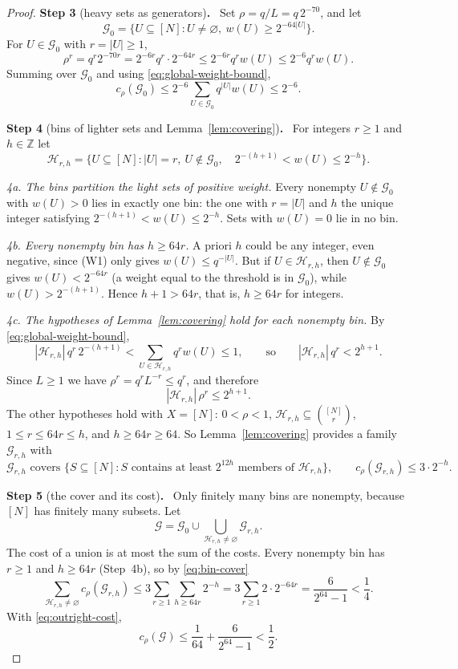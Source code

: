 \documentclass[11pt,letterpaper]{article}
\theoremstyle{definition}
\theoremstyle{remark}
\numberwithin{equation}{section}
\newcommand{\step}[2]{\medskip\noindent\textbf{Step #1} (#2)\textbf{.}\ }
\begin{document}
\begin{proof}
\step{3}{heavy sets as generators}
Set $\rho=q/L=q\,2^{-70}$, and let
\[
 \mathcal G_0=
 \{U\subseteq[N]:U\ne\varnothing,\ w(U)\ge2^{-64|U|}\}.
\]
For $U\in\mathcal G_0$ with $r=|U|\ge1$,
\[
 \rho^r=q^r2^{-70r}=2^{-6r}q^r\cdot2^{-64r}
 \le2^{-6r}q^r w(U)
 \le2^{-6}q^r w(U).
\]
Summing over $\mathcal G_0$ and using \eqref{eq:global-weight-bound},
\begin{equation}\label{eq:outright-cost}
 c_\rho(\mathcal G_0)\le2^{-6}\sum_{U\in\mathcal G_0}q^{|U|}w(U)\le2^{-6}.
\end{equation}

\step{4}{bins of lighter sets and Lemma~\ref{lem:covering}}
For integers $r\ge1$ and $h\in\mathbb Z$ let
\[
 \mathcal H_{r,h}=
 \bigl\{U\subseteq[N]:|U|=r,\ U\notin\mathcal G_0,
 \quad 2^{-(h+1)}<w(U)\le2^{-h}\bigr\}.
\]

\emph{4a. The bins partition the light sets of positive weight.} Every
nonempty $U\notin\mathcal G_0$ with $w(U)>0$ lies in exactly one bin: the
one with $r=|U|$ and $h$ the unique integer satisfying
$2^{-(h+1)}<w(U)\le2^{-h}$. Sets with $w(U)=0$ lie in no bin.

\emph{4b. Every nonempty bin has $h\ge64r$.} A priori $h$ could be any
integer, even negative, since (W1) only gives $w(U)\le q^{-|U|}$. But if
$U\in\mathcal H_{r,h}$, then $U\notin\mathcal G_0$ gives $w(U)<2^{-64r}$
(a weight equal to the threshold is in $\mathcal G_0$), while
$w(U)>2^{-(h+1)}$. Hence $h+1>64r$, that is, $h\ge64r$ for integers.

\emph{4c. The hypotheses of Lemma~\ref{lem:covering} hold for each
nonempty bin.} By \eqref{eq:global-weight-bound},
\[
 |\mathcal H_{r,h}|\,q^r\,2^{-(h+1)}
 <\sum_{U\in\mathcal H_{r,h}}q^r w(U)\le1,
 \qquad\text{so}\qquad |\mathcal H_{r,h}|\,q^r<2^{h+1}.
\]
Since $L\ge1$ we have $\rho^r=q^rL^{-r}\le q^r$, and therefore
\[
 |\mathcal H_{r,h}|\,\rho^r\le2^{h+1}.
\]
The other hypotheses hold with $X=[N]$: $0<\rho<1$,
$\mathcal H_{r,h}\subseteq\binom{[N]}{r}$, $1\le r\le64r\le h$, and
$h\ge64r\ge64$. So Lemma~\ref{lem:covering} provides a family
$\mathcal G_{r,h}$ with
\begin{equation}\label{eq:bin-cover}
\mathcal G_{r,h}\text{ covers }
\bigl\{S\subseteq[N]:S\text{ contains at least }2^{12h}\text{ members of }
\mathcal H_{r,h}\bigr\},
\qquad
 c_\rho(\mathcal G_{r,h})\le3\cdot2^{-h}.
\end{equation}

\step{5}{the cover and its cost}
Only finitely many bins are nonempty, because $[N]$ has finitely many
subsets. Let
\[
 \mathcal G=\mathcal G_0\cup\bigcup_{\mathcal H_{r,h}\ne\varnothing}
 \mathcal G_{r,h}.
\]
The cost of a union is at most the sum of the costs. Every nonempty bin
has $r\ge1$ and $h\ge64r$ (Step~4b), so by \eqref{eq:bin-cover}
\begin{equation}\label{eq:bin-cost-sum}
 \sum_{\mathcal H_{r,h}\ne\varnothing}c_\rho(\mathcal G_{r,h})
 \le3\sum_{r\ge1}\sum_{h\ge64r}2^{-h}
 =3\sum_{r\ge1}2\cdot2^{-64r}
 =\frac{6}{2^{64}-1}<\frac14 .
\end{equation}
With \eqref{eq:outright-cost},
\[
 c_\rho(\mathcal G)
 \le\frac1{64}+\frac{6}{2^{64}-1}<\frac12.
\]


\end{proof}
\end{document}
